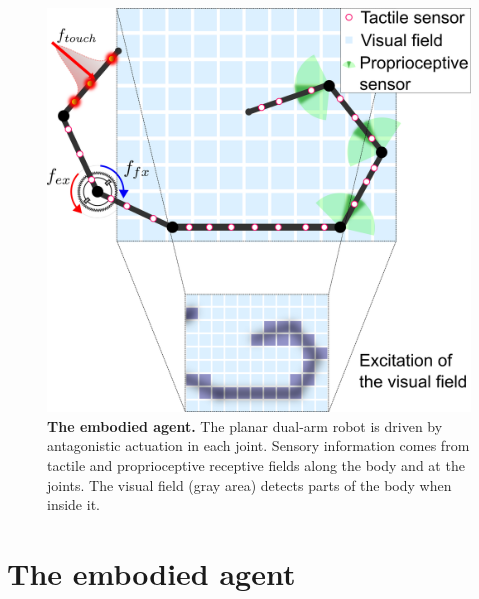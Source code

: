 \begin{figure}[!t]
	\begin{center}
		\hspace*{\fill}
		\includegraphics[width=0.99\columnwidth]{extended_planar_dual_arm_with_vision_v2.png}
		\hspace*{\fill}
	\end{center}
	\caption{\label{fig:extended_dual_arm_robot} \textbf{The embodied agent.} The planar dual-arm robot is driven by antagonistic actuation in each joint. Sensory information comes from tactile and proprioceptive receptive fields along the body and at the joints. The visual field (gray area) detects parts of the body when inside it.}
    \vspace{-20pt}
\end{figure}
\section{The embodied agent}\label{sec:the_embodied_agent}

